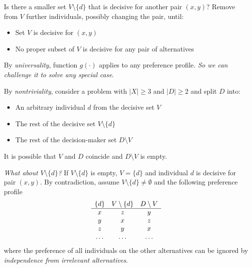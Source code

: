 Is there a smaller set $V \setminus \{d\}$ that is decisive for another pair $(x,y)$? Remove from $V$ further individuals, possibly changing the pair, until: 
\begin{itemize}
	\item Set $V$ is decisive for $(x,y)$
	
	\item No proper subset of $V$ is decisive for any pair of alternatives
\end{itemize}

By \textit{universality}, function $g(\cdot)$ applies to any preference profile. \textit{So we can challenge it to solve any special case}.

By \textit{nontriviality}, consider a problem with $|X| \geq 3$ and $|D| \geq 2$ and split $D$ into: 
\begin{itemize}
	\item An arbitrary individual $d$ from the decisive set $V$
	
	\item The rest of the decisive set $V \setminus \{d\}$
	
	\item The rest of the decision-maker set $D \setminus V$
\end{itemize}
It is possible that $V$ and $D$ coincide and $D \setminus V$ is empty.

\textit{What about $V \setminus\{d\}$?} If $V \setminus \{d\}$ is empty, $V = \{d\}$ and individual $d$ is decisive for pair $(x, y)$. By contradiction, assume $V \setminus \{d\} \neq \emptyset$ and the following preference profile
$$ 
\begin{array}{c c c}
	\{d\} & V \setminus \{d\} & D \setminus V \\
	\hline
	x & z & y  \\
	y & x & z  \\
	z & y & x  \\
	\dots & \dots & \dots 
\end{array}
$$
where the preference of all individuals on the other alternatives can be ignored by \textit{independence from irrelevant alternatives}.


